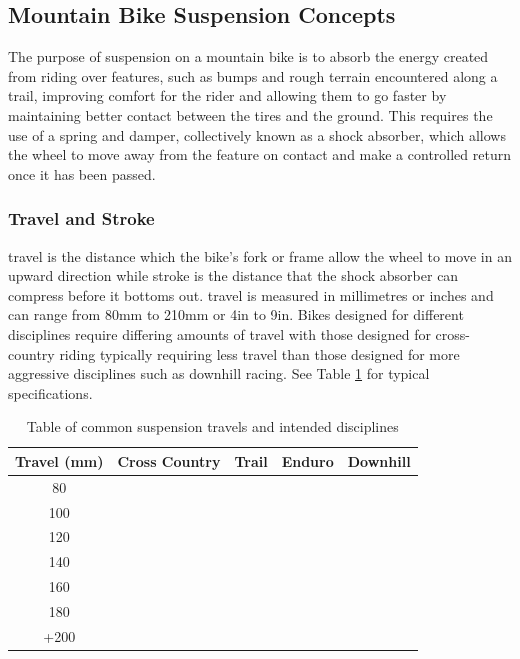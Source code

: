 	\subsection{Mountain Bike Suspension Concepts}
		The purpose of suspension on a mountain bike is to absorb the energy created from riding over features, such as bumps and rough terrain encountered along a trail, improving comfort for the rider and allowing them to go faster by maintaining better contact between the tires and the ground. This requires the use of a spring and damper, collectively known as a shock absorber, which allows the wheel to move away from the feature on contact and make a controlled return once it has been passed.
	\subsubsection{Travel and Stroke}
		\Gls{travel} is the distance which the bike’s fork or frame allow the wheel to move in an upward direction while \gls{stroke} is the distance that the shock absorber can compress before it bottoms out. \Gls{travel} is measured in millimetres or inches and can range from 80mm to 210mm or 4in to 9in. Bikes designed for different disciplines require differing amounts of travel with those designed for cross-country riding typically requiring less travel than those designed for more aggressive disciplines such as downhill racing. See Table \ref{tab:travel} for typical specifications.
		\begin{table}[h!]
		\centering
		\caption{Table of common suspension \glspl{travel} and intended disciplines}
		\label{tab:travel}
		\begin{tabular}{|c|cccc|}
			\hline
			Travel (mm)&Cross Country&Trail&Enduro&Downhill\\
			\hline
			80&\cellcolor[gray]{0.5}&&&
			\\
			100&\cellcolor[gray]{0.5}&&&
			\\
			120&\cellcolor[gray]{0.5}&\cellcolor[gray]{0.5}&&
			\\
			140&&\cellcolor[gray]{0.5}&\cellcolor[gray]{0.5}&
			\\
			160&&&\cellcolor[gray]{0.5}&
			\\
			180&&&\cellcolor[gray]{0.5}&\cellcolor[gray]{0.5}
			\\
			+200&&&&\cellcolor[gray]{0.5}\\
			\hline
		\end{tabular}
	\end{table}
